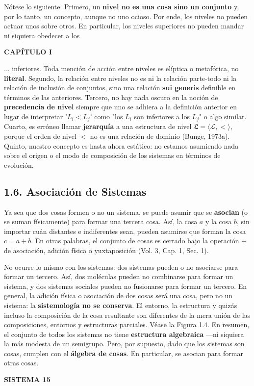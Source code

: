 {Nótese lo siguiente. Primero, un \textbf{nivel no es una cosa sino un conjunto} y, por lo tanto, un concepto, aunque no uno ocioso. Por ende, los niveles no pueden actuar unos sobre otros. En particular, los niveles superiores no pueden mandar ni siquiera obedecer a los
}
\newpage
\fancyhf{}
\fancyhead[L]{\thepage} 
\begin{center}
{\fontsize{16}{18}\selectfont \textbf{CAPÍTULO I}}
\end{center}
\vspace{0.5cm}

{\fontsize{13}{15}\selectfont
... inferiores. Toda mención de acción entre niveles es elíptica o metafórica, no \textbf{literal}. Segundo, la relación entre niveles no es ni la relación parte-todo ni la relación de inclusión de conjuntos, sino una relación \textbf{sui generis} definible en términos de las anteriores. Tercero, no hay nada oscuro en la noción de \textbf{precedencia de nivel} siempre que uno se adhiera a la definición anterior en lugar de interpretar '$L_i < L_j$' como "los $L_i$ son inferiores a los $L_j$" o algo similar. Cuarto, es erróneo llamar \textbf{jerarquía} a una estructura de nivel $\mathfrak{L} = \langle \mathcal{L}, < \rangle$, porque el orden de nivel $<$ no es una relación de dominio (Bunge, 1973a). Quinto, nuestro concepto es hasta ahora estático: no estamos asumiendo nada sobre el origen o el modo de composición de los sistemas en términos de evolución.

\subsection*{1.6. Asociación de Sistemas}
Ya sea que dos cosas formen o no un sistema, se puede asumir que se \textbf{asocian} (o se suman físicamente) para formar una tercera cosa. Así, la cosa $a$ y la cosa $b$, sin importar cuán distantes e indiferentes sean, pueden asumirse que forman la cosa $c = a + b$. En otras palabras, el conjunto de cosas es cerrado bajo la operación $+$ de asociación, adición física o yuxtaposición (Vol. 3, Cap. 1, Sec. 1).

No ocurre lo mismo con los sistemas: dos sistemas pueden o no asociarse para formar un tercero. Así, dos moléculas pueden no combinarse para formar un sistema, y dos sistemas sociales pueden no fusionarse para formar un tercero. En general, la adición física o asociación de dos cosas será una cosa, pero no un sistema: la \textbf{sistemología no se conserva}. El entorno, la estructura y quizás incluso la composición de la cosa resultante son diferentes de la mera unión de las composiciones, entornos y estructuras parciales. Véase la Figura 1.4. En resumen, el conjunto de todos los sistemas no tiene \textbf{estructura algebraica} —ni siquiera la más modesta de un semigrupo. Pero, por supuesto, dado que los sistemas son cosas, cumplen con el \textbf{álgebra de cosas}. En particular, se asocian para formar otras cosas.

}
\newpage
\fancyhf{}
\fancyhead[R]{\thepage} 
\begin{center}
{\fontsize{16}{18}\selectfont \textbf{SISTEMA 15}}
\end{center}
\vspace{0.5cm}

